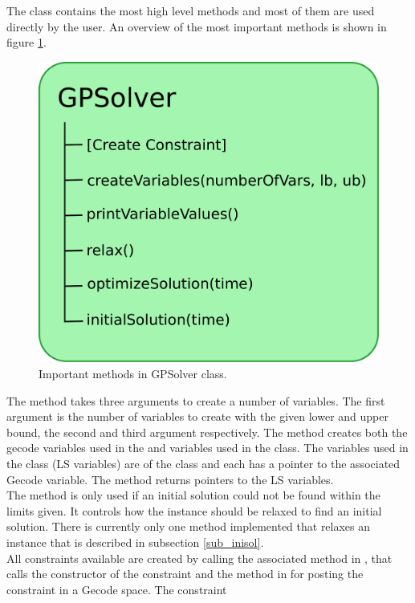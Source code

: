 The \gensol class contains the most high level methods and most of them are used directly by the user. An overview of 
the most important methods is shown in figure \ref{fig_general}. \\ \noindent
\begin{figure}[!b] 
\begin{center}
\includegraphics[width=0.8\linewidth]{general.pdf} \caption{Important methods in GPSolver class.} 
\label{fig_general}
\end{center} 
\end{figure} 
The method  takes three arguments to create a number of variables. The first argument 
is the number of variables to create with the given lower and upper bound, the second and third argument respectively. 
The method creates both the gecode variables used in the  and variables used in the 
 class. The variables used in the  class (LS variables) are of the 
class 
 and each has a pointer to the associated Gecode variable. The method returns pointers to the LS 
variables. \\ 
The method  is only used if an initial solution could not be found within the limits given. It controls 
how the instance should be relaxed to find an initial solution. There is currently only one method implemented that 
relaxes an instance that is described in subsection \ref{sub_inisol}. \\
All constraints available are created by calling the associated method in \gensol, that calls the constructor 
of the constraint and the method in  for posting the constraint in a Gecode space. The constraint 
